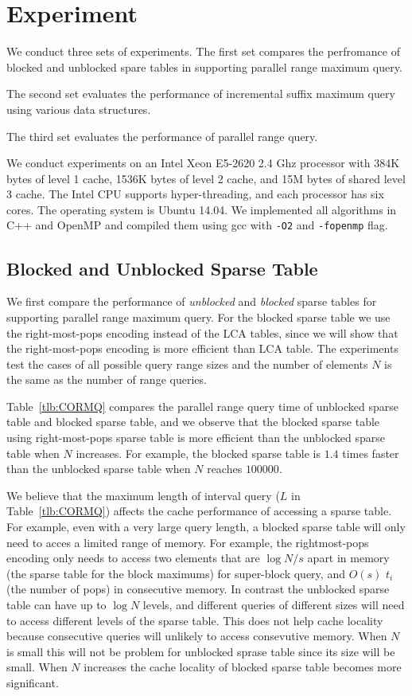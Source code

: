 \section{Experiment} \label{sec:Experiment}

We conduct three sets of experiments.  The first set compares the
perfromance of blocked and unblocked spare tables in supporting
parallel range maximum query.

The second set evaluates the performance of incremental suffix maximum
query using various data structures.

The third set evaluates the performance of parallel range query.

We conduct experiments on an Intel Xeon E5-2620 2.4 Ghz processor with
384K bytes of level 1 cache, 1536K bytes of level 2 cache, and 15M
bytes of shared level 3 cache.  The Intel CPU supports
hyper-threading, and each processor has six cores.  The operating
system is Ubuntu 14.04.  We implemented all algorithms in C++ and
OpenMP and compiled them using gcc with {\tt -O2} and {\tt -fopenmp}
flag.

\subsection{Blocked and Unblocked Sparse Table}

We first compare the performance of {\em unblocked} and {\em blocked}
sparse tables for supporting parallel range maximum query.  For the
blocked sparse table we use the right-most-pops encoding instead of
the LCA tables, since we will show that the right-most-pops encoding
is more efficient than LCA table.  The experiments test the cases of
all possible query range sizes and the number of elements $N$ is the
same as the number of range queries.

Table~\ref{tlb:CORMQ} compares the parallel range query time of
unblocked sparse table and blocked sparse table, and we observe that
the blocked sparse table using right-most-pops sparse table is more
efficient than the unblocked sparse table when $N$ increases.  For
example, the blocked sparse table is $1.4$ times faster than the
unblocked sparse table when $N$ reaches $100000$.

We believe that the maximum length of interval query ($L$ in
Table~\ref{tlb:CORMQ}) affects the cache performance of accessing a
sparse table.  For example, even with a very large query length, a
blocked sparse table will only need to acces a limited range of
memory.  For example, the rightmost-pops encoding only needs to access
two elements that are $\log {N/s}$ apart in memory (the sparse table
for the block maximums) for super-block query, and $O(s)$ $t_i$ (the
number of pops) in consecutive memory.  In contrast the unblocked
sparse table can have up to $\log N$ levels, and different queries of
different sizes will need to access different levels of the sparse
table.  This does not help cache locality because consecutive queries
will unlikely to access consevutive memory.  When $N$ is small this
will not be problem for unblocked sprase table since its size will be
small.  When $N$ increases the cache locality of blocked sparse table
becomes more significant.

